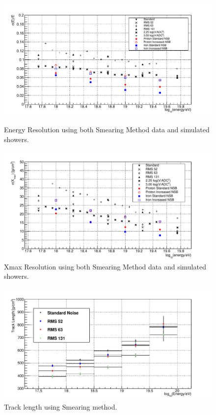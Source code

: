 \begin{figure}
\centering
\includegraphics[width=\textwidth]{chapters/graphs/SelectionEff/Combined_EnergyRes_All.pdf}
\caption{Energy Resolution using both Smearing Method data and simulated showers.}
\vspace{3mm}
\includegraphics[width=\textwidth]{chapters/graphs/SelectionEff/Combined_XmaxRes_All.pdf}
\caption{Xmax Resolution using both Smearing Method data and simulated showers.}
\end{figure}

\begin{figure}
\centering
\includegraphics[width=\textwidth]{chapters/graphs/SelectionEff/Smearing_TrackLength_DiffNSBlevels.pdf}
\caption{Track length using Smearing method.} \label{fig:TrackLength_Smearing}
\end{figure}
